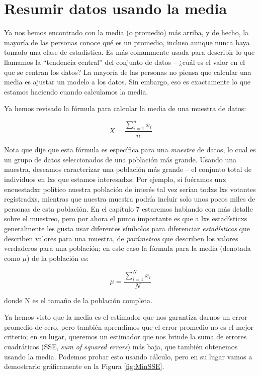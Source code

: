 \documentclass[
  12pt,
]{book}
\begin{document}
\hypertarget{resumir-datos-usando-la-media}{%
\section{Resumir datos usando la media}\label{resumir-datos-usando-la-media}}

Ya nos hemos encontrado con la media (o promedio) más arriba, y de hecho, la mayoría de las personas conoce qué es un promedio, incluso aunque nunca haya tomado una clase de estadística. Es más comunmente usada para describir lo que llamamos la ``tendencia central'' del conjunto de datos -- ¿cuál es el valor en el que se centran los datos? La mayoría de las personas no piensa que calcular una media es ajustar un modelo a los datos. Sin embargo, eso es exactamente lo que estamos haciendo cuando calculamos la media.

Ya hemos revisado la fórmula para calcular la media de una muestra de datos:

\[
\bar{X} = \frac{\sum_{i=1}^{n}x_i}{n}
\]

Nota que dije que esta fórmula es específica para una \emph{muestra} de datos, lo cual es un grupo de datos seleccionados de una población más grande. Usando una muestra, deseamos caracterizar una población más grande -- el conjunto total de individuos en lxs que estamos interesadxs. Por ejemplo, si fuéramos unx encuestadxr político nuestra población de interés tal vez serían todxs lxs votantes registradxs, mientras que nuestra muestra podría incluir solo unos pocos miles de personas de esta población. En el capítulo 7 estaremos hablando con más detalle sobre el muestreo, pero por ahora el punto importante es que a lxs estadísticxs generalmente les gusta usar diferentes símbolos para diferenciar \emph{estadísticas} que describen valores para una muestra, de \emph{parámetros} que describen los valores verdaderos para una población; en este caso la fórmula para la media (denotada como \(\mu\)) de la población es:

\[
\mu = \frac{\sum_{i=1}^{N}x_i}{N}
\]

donde N es el tamaño de la población completa.

Ya hemos visto que la media es el estimador que nos garantiza darnos un error promedio de cero, pero también aprendimos que el error promedio no es el mejor criterio; en su lugar, queremos un estimador que nos brinde la suma de errores cuadráticos (SSE, \emph{sum of squared errors}) más baja, que también obtenemos usando la media. Podemos probar esto usando cálculo, pero en su lugar vamos a demostrarlo gráficamente en la Figura \ref{fig:MinSSE}.
\end{document}
